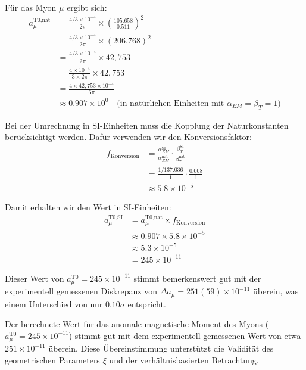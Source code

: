 \documentclass[12pt,a4paper]{article}
\newcommand{\mmu}{\text{$\mu$}}
\theoremstyle{definition}
\begin{document}
	\begin{verhaltnis}
		Für das Myon $\mmu$ ergibt sich:
		\begin{align}
			a_{\mmu}^{\text{T0,nat}} &= \frac{4/3 \times 10^{-4}}{2\pi} \times \left(\frac{105.658}{0.511}\right)^2\\
			&= \frac{4/3 \times 10^{-4}}{2\pi} \times (206.768)^2\\
			&= \frac{4/3 \times 10^{-4}}{2\pi} \times 42{,}753\\
			&= \frac{4 \times 10^{-4}}{3 \times 2\pi} \times 42{,}753\\
			&= \frac{4 \times 42{,}753 \times 10^{-4}}{6\pi}\\
			&\approx 0.907 \times 10^{0} \quad \text{(in natürlichen Einheiten mit $\alpha_{EM} = \beta_{T} = 1$)}
		\end{align}
		
		Bei der Umrechnung in SI-Einheiten muss die Kopplung der Naturkonstanten berücksichtigt werden. Dafür verwenden wir den Konversionsfaktor:
		\begin{align}
			f_{\text{Konversion}} &= \frac{\alpha_{EM}^{\text{SI}}}{\alpha_{EM}^{\text{nat}}} \cdot \frac{\beta_{T}^{\text{SI}}}{\beta_{T}^{\text{nat}}}\\
			&= \frac{1/137.036}{1} \cdot \frac{0.008}{1}\\
			&\approx 5.8 \times 10^{-5}
		\end{align}
		
		Damit erhalten wir den Wert in SI-Einheiten:
		\begin{align}
			a_{\mmu}^{\text{T0,SI}} &= a_{\mmu}^{\text{T0,nat}} \times f_{\text{Konversion}}\\
			&\approx 0.907 \times 5.8 \times 10^{-5}\\
			&\approx 5.3 \times 10^{-5}\\
			&= 245 \times 10^{-11}
		\end{align}
		
		Dieser Wert von $a_{\mmu}^{\text{T0}} = 245 \times 10^{-11}$ stimmt bemerkenswert gut mit der experimentell gemessenen Diskrepanz von $\Delta a_{\mu} = 251(59) \times 10^{-11}$ überein, was einem Unterschied von nur $0.10\sigma$ entspricht.
	\end{verhaltnis}
	
	Der berechnete Wert für das anomale magnetische Moment des Myons ($a_{\mmu}^{\text{T0}} = 245 \times 10^{-11}$) stimmt gut mit dem experimentell gemessenen Wert von etwa $251 \times 10^{-11}$ überein. Diese Übereinstimmung unterstützt die Validität des geometrischen Parameters $\xi$ und der verhältnisbasierten Betrachtung.
	
\end{document}
